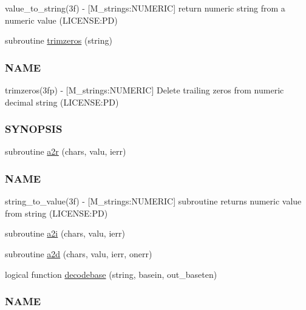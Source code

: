 \begin{DoxyCompactItemize}
\begin{DoxyCompactList}
value\+\_\+to\+\_\+string(3f) -\/ \mbox{[}M\+\_\+strings\+:N\+U\+M\+E\+R\+IC\mbox{]} return numeric string from a numeric value (L\+I\+C\+E\+N\+SE\+:PD) \end{DoxyCompactList}\item 
subroutine \mbox{\hyperlink{namespacem__time__duplicate_ae5ec641c9bdaa5d9377e47310e2165be}{trimzeros}} (string)
\begin{DoxyCompactList}\small\item\em \subsubsection*{N\+A\+ME}

trimzeros(3fp) -\/ \mbox{[}M\+\_\+strings\+:N\+U\+M\+E\+R\+IC\mbox{]} Delete trailing zeros from numeric decimal string (L\+I\+C\+E\+N\+SE\+:PD) \subsubsection*{S\+Y\+N\+O\+P\+S\+IS}\end{DoxyCompactList}\item 
subroutine \mbox{\hyperlink{namespacem__time__duplicate_a9e2a87974ffb9b81dcfb0ecee076180f}{a2r}} (chars, valu, ierr)
\begin{DoxyCompactList}\small\item\em \subsubsection*{N\+A\+ME}

string\+\_\+to\+\_\+value(3f) -\/ \mbox{[}M\+\_\+strings\+:N\+U\+M\+E\+R\+IC\mbox{]} subroutine returns numeric value from string (L\+I\+C\+E\+N\+SE\+:PD) \end{DoxyCompactList}\item 
subroutine \mbox{\hyperlink{namespacem__time__duplicate_aaf8891d2fdbd165fecbdf78335f926fc}{a2i}} (chars, valu, ierr)
\item 
subroutine \mbox{\hyperlink{namespacem__time__duplicate_ab86bb390cc56184faeef5543735eecc4}{a2d}} (chars, valu, ierr, onerr)
\item 
logical function \mbox{\hyperlink{namespacem__time__duplicate_a66a83a4b3d6324843c984658784b2c4e}{decodebase}} (string, basein, out\+\_\+baseten)
\begin{DoxyCompactList}\small\item\em \subsubsection*{N\+A\+ME}\end{DoxyCompactList}\end{DoxyCompactItemize}


